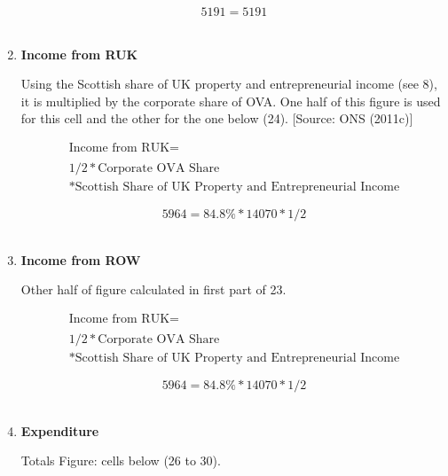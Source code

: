 \begin{enumerate}
\begin{equation} \nonumber
5191 = 5191
\end{equation}\\


\item \textbf {Income from RUK}

Using the Scottish share of UK property and entrepreneurial income (see 8), it is multiplied by the corporate share of OVA. One half of this figure is used for this cell and the other for the one below (24). [Source: ONS (2011c)]

\begin{equation}
\begin{split}
\text{Income from RUK} =  \\ \\
1/2*\text{Corporate OVA Share}\\
*\text{Scottish Share of UK Property and Entrepreneurial Income}
\end{split} \label{eq:2.5.26}
\end{equation}

\begin{equation} \nonumber
5964 = 84.8\%*14070*1/2
\end{equation}\\


\item \textbf {Income from ROW}

Other half of figure calculated in first part of 23.

\begin{equation}
\begin{split}
\text{Income from RUK} =  \\ \\
1/2*\text{Corporate OVA Share}\\
*\text{Scottish Share of UK Property and Entrepreneurial Income}
\end{split} \label{eq:2.5.27}
\end{equation}

\begin{equation} \nonumber
5964 = 84.8\%*14070*1/2
\end{equation}\\


\pagebreak

\item \textbf {Expenditure}

Totals Figure: cells below (26 to 30).


\end{enumerate}
